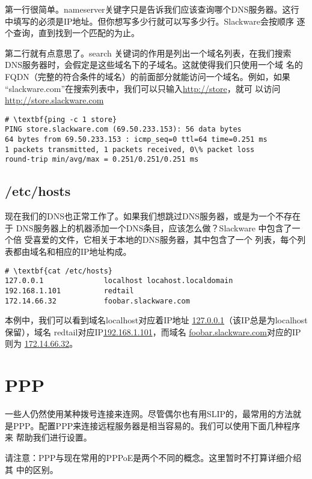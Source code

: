 第一行很简单。nameserver关键字只是告诉我们应该查询哪个DNS服务器。这行
中填写的必须是IP地址。但你想写多少行就可以写多少行。Slackware会按顺序
逐个查询，直到找到一个匹配的为止。

第二行就有点意思了。search 关键词的作用是列出一个域名列表，在我们搜索
DNS服务器时，会假定是这些域名下的子域名。这就使得我们只使用一个域
名的FQDN（完整的符合条件的域名）的前面部分就能访问一个域名。例如，如果
``slackware.com''在搜索列表中，我们可以只输入\url{http://store}，就可
以访问\url{http://store.slackware.com}
\begin{Verbatim}[frame=single,commandchars=\\\{\}]
# \textbf{ping -c 1 store}
PING store.slackware.com (69.50.233.153): 56 data bytes
64 bytes from 69.50.233.153 : icmp_seq=0 ttl=64 time=0.251 ms
1 packets transmitted, 1 packets received, 0\% packet loss
round-trip min/avg/max = 0.251/0.251/0.251 ms
\end{Verbatim}


\subsection{/etc/hosts}
\label{sec:networkConfiguration:tcpIP:hosts}
现在我们的DNS也正常工作了。如果我们想跳过DNS服务器，或是为一个不存在于
DNS服务器上的机器添加一个DNS条目，应该怎么做？Slackware 中包含了一个倍
受喜爱的文件，它相关于本地的DNS服务器，其中包含了一个
列表，每个列表都由域名和相应的IP地址构成。
\begin{Verbatim}[frame=single,commandchars=\\\{\}]
# \textbf{cat /etc/hosts}
127.0.0.1              localhost locahost.localdomain
192.168.1.101          redtail
172.14.66.32           foobar.slackware.com
\end{Verbatim}
本例中，我们可以看到域名localhost对应着IP地址
\href{http://127.0.0.1}{127.0.0.1}（该IP总是为localhost保留），域名
redtail对应IP\href{http://192.168.1.101}{192.168.1.101}，而域名
\href{http://foobar.slackware.com}{foobar.slackware.com}对应的IP则为
\href{http://172.14.66.32}{172.14.66.32}。

\section{PPP}
\label{sec:networkConfiguration:ppp}
一些人仍然使用某种拨号连接来连网。尽管偶尔也有用SLIP的，最常用的方法就
是PPP。配置PPP来连接远程服务器是相当容易的。我们可以使用下面几种程序来
帮助我们进行设置。

请注意：PPP与现在常用的PPPoE是两个不同的概念。这里暂时不打算详细介绍其
中的区别。%

